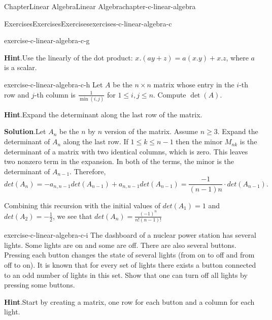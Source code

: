 \documentclass[oneside,10pt,]{book}
\newcommand{\blocktitlefont}{\relax}
\numberwithin{equation}{section}
\begin{document}
\begin{chapterptx}{Chapter}{Linear Algebra}{}{Linear Algebra}{}{}{chapter-c-linear-algebra}
\begin{exercises-section}{Exercises}{Exercises}{}{Exercises}{}{}{exercises-c-linear-algebra-c}
\begin{divisionexercise}{6}{}{}{exercise-c-linear-algebra-c-g}
\par\smallskip%
\noindent\textbf{\blocktitlefont Hint}.\hypertarget{hint-c-linear-algebra-c-g-b}{}\quad{}Use the linearly of the dot product: \(x.(a y+z) = a(x.y)+x.z\), where \(a\) is a scalar.%
\end{divisionexercise}%
\begin{divisionexercise}{7}{}{}{exercise-c-linear-algebra-c-h}%
Let \(A\) be the \(n\times n\) matrix whose entry in the \(i\)-th row and \(j\)-th column is \(\frac{1}{\min (i,j)}\) for \(1 \leq  i,j \leq  n\). Compute \(\det (A)\).%
\par\smallskip%
\noindent\textbf{\blocktitlefont Hint}.\hypertarget{hint-c-linear-algebra-c-h-b}{}\quad{}Expand the determinant along the last row of the matrix.%
\par\smallskip%
\noindent\textbf{\blocktitlefont Solution}.\hypertarget{solution-c-linear-algebra-c-h-c}{}\quad{}Let \(A_n\) be the \(n\) by \(n\) version of the matrix. Assume \(n \geq 3\). Expand the determinant of \(A_n\) along the last row. If \(1 \leq k \leq n-1\) then the minor \(M_{n k}\) is the determinant of a matrix with two identical columns, which is zero.    This leaves two nonzero term in the expansion. In both of the terms, the minor is the determinant of \(A_{n-1}\).  Therefore,%
\begin{equation*}
det(A_{n}) = - a_{n,n-1}  det(A_{n-1}) + a_{n,n-1}  det(A_{n-1}) =\frac{-1}{(n-1)n} \cdot det(A_{n-1}).
\end{equation*}
%
\par
Combining this recursion with the initial values of \(det(A_{1})=1\) and \(det(A_{2})=-\frac{1}{2}\), we see that  \(det(A_{n}) = \frac{(-1)^n}{n! (n-1)!}\)%
\end{divisionexercise}%
\begin{divisionexercise}{8}{}{}{exercise-c-linear-algebra-c-i}%
The dashboard of a nuclear power station has several lights. Some lights are on and some are off. There are also several buttons. Pressing each button changes the state of several lights (from on to off and from off to on). It is known that for every set of lights there exists a button connected to an odd number of lights in this set. Show that one can turn off all lights by pressing some buttons.%
\par\smallskip%
\noindent\textbf{\blocktitlefont Hint}.\hypertarget{hint-c-linear-algebra-c-i-b}{}\quad{}Start by creating a matrix, one row for each button and a column for each light.%
\par\smallskip%

\end{divisionexercise}
\end{exercises-section}
\end{chapterptx}
\end{document}

